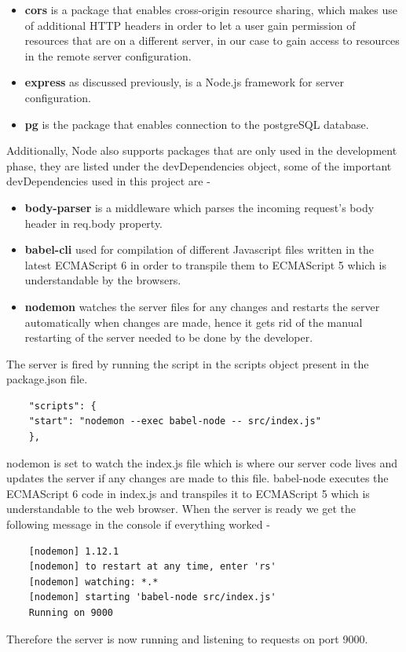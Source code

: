 \documentclass[../thesis.tex]{subfiles}
\begin{document}
	\begin{itemize}
		\item \textbf{cors} is a package that enables cross-origin resource sharing, which makes use of additional HTTP headers in order to let a user gain permission of resources that are on a different server, in our case to gain access to resources in the remote server configuration.

		\item \textbf{express} as discussed previously, is a Node.js framework for server configuration.

		\item \textbf{pg} is the package that enables connection to the postgreSQL database.
	\end{itemize}

	Additionally, Node also supports packages that are only used in the development phase, they are listed under the devDependencies object, some of the important devDependencies used in this project are - 
	\bigskip
	\begin{itemize}
		\item \textbf{body-parser} is a middleware which parses the incoming request's body header in req.body property.

		\item \textbf{babel-cli} used for compilation of different Javascript files written in the latest ECMAScript 6 in order to transpile them to ECMAScript 5 which is understandable by the browsers.

		\item \textbf{nodemon} watches the server files for any changes and restarts the server automatically when changes are made, hence it gets rid of the manual restarting of the server needed to be done by the developer.
	\end{itemize}

	The server is fired by running the script in the scripts object present in the package.json file.
	\begin{verbatim}
	"scripts": {
	"start": "nodemon --exec babel-node -- src/index.js"
	},
	\end{verbatim}
	nodemon is set to watch the index.js file which is where our server code lives and updates the server if any changes are made to this file. babel-node executes the ECMAScript 6 code in index.js and transpiles it to ECMAScript 5 which is understandable to the web browser. When the server is ready we get the following message in the console if everything worked - 
	\begin{verbatim}
	[nodemon] 1.12.1
	[nodemon] to restart at any time, enter 'rs'
	[nodemon] watching: *.*
	[nodemon] starting 'babel-node src/index.js'
	Running on 9000
	\end{verbatim}
	Therefore the server is now running and listening to requests on port 9000.
	
\end{document}

